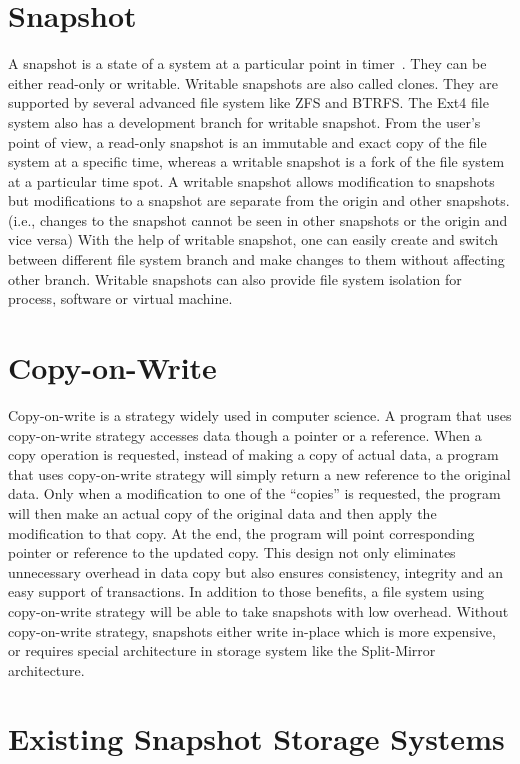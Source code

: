 \section{Snapshot}

    A snapshot is a state of a system at a particular point in timer~\cite{btrfscow}. They can be either read-only or writable. Writable snapshots are also called clones. They are supported by several advanced file system like ZFS and BTRFS. The Ext4 file system also has a development branch for writable snapshot. From the user’s point of view, a read-only snapshot is an immutable and exact copy of the file system at a specific time, whereas a writable snapshot is a fork of the file system at a particular time spot. A writable snapshot allows modification to snapshots but modifications to a snapshot are separate from the origin and other snapshots. (i.e., changes to the snapshot cannot be seen in other snapshots or the origin and vice versa) With the help of writable snapshot, one can easily create and switch between different file system branch and make changes to them without affecting other branch. Writable snapshots can also provide file system isolation for process, software or virtual machine.

\section{Copy-on-Write}

    Copy-on-write is a strategy widely used in computer science. A program that uses copy-on-write strategy accesses data though a pointer or a reference. When a copy operation is requested, instead of making a copy of actual data, a program that uses copy-on-write strategy will simply return a new reference to the original data. Only when a modification to one of the ``copies'' is requested, the program will then make an actual copy of the original data and then apply the modification to that copy. At the end, the program will point corresponding pointer or reference to the updated copy. This design not only eliminates unnecessary overhead in data copy but also ensures consistency, integrity and an easy support of transactions. In addition to those benefits, a file system using copy-on-write strategy will be able to take snapshots with low overhead. Without copy-on-write strategy, snapshots either write in-place which is more expensive, or requires special architecture in storage system like the Split-Mirror architecture.

\section{Existing Snapshot Storage Systems}

